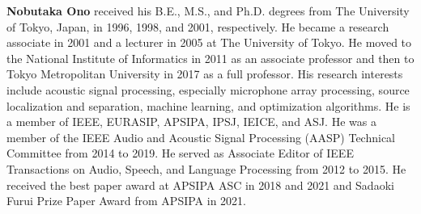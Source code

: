 \documentclass[sip,biber]{now-journal}
\begin{document}
\noindent\normalsize\textbf{Nobutaka Ono}
received his B.E., M.S., and Ph.D. degrees from The University of Tokyo, Japan, in 1996, 1998, and 2001, respectively.
He became a research associate in 2001 and a lecturer in 2005 at The University of Tokyo.
He moved to the National Institute of Informatics in 2011 as an associate professor and then to Tokyo Metropolitan University in 2017 as a full professor.
His research interests include acoustic signal processing, especially microphone array processing, source localization and separation, machine learning, and optimization algorithms.
He is a member of IEEE, EURASIP, APSIPA, IPSJ, IEICE, and ASJ.
He was a member of the IEEE Audio and Acoustic Signal Processing (AASP) Technical Committee from 2014 to 2019.
He served as Associate Editor of IEEE Transactions on Audio, Speech, and Language Processing from 2012 to 2015.
He received the best paper award at APSIPA ASC in 2018 and 2021 and Sadaoki Furui Prize Paper Award from APSIPA in 2021.

\printbibliography
\end{document}
